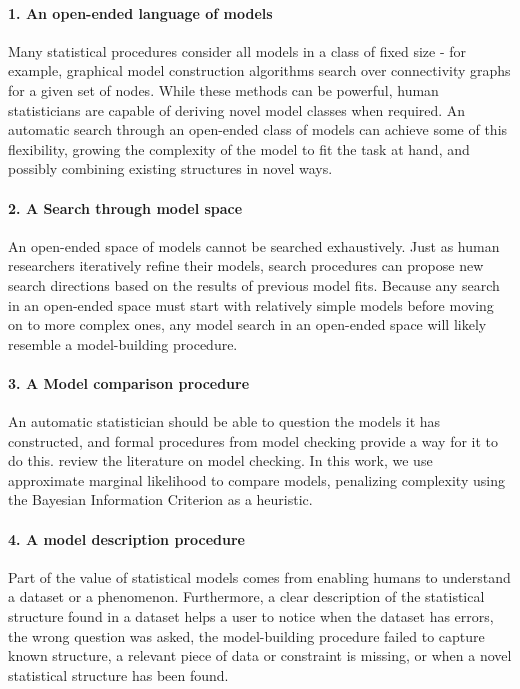 \paragraph{1. An open-ended language of models}
Many statistical procedures consider all models in a class of fixed size - for example, graphical model construction algorithms search over connectivity graphs for a given set of nodes.
While these methods can be powerful, human statisticians are capable of deriving novel model classes when required.
An automatic search through an open-ended class of models can achieve some of this flexibility, growing the complexity of the model to fit the task at hand, and possibly combining existing structures in novel ways.

\paragraph{2. A Search through model space}
An open-ended space of models cannot be searched exhaustively.
Just as human researchers iteratively refine their models, search procedures can propose new search directions based on the results of previous model fits.
Because any search in an open-ended space must start with relatively simple models before moving on to more complex ones, any model search in an open-ended space will likely resemble a model-building procedure.%

\paragraph{3. A Model comparison procedure}
An automatic statistician should be able to question the models it has constructed, and formal procedures from model checking provide a way for it to do this.
\citet{gelman2012philosophy} review the literature on model checking.
In this work, we use approximate marginal likelihood to compare models, penalizing complexity using the Bayesian Information Criterion as a heuristic.

\paragraph{4. A model description procedure}
Part of the value of statistical models comes from enabling humans to understand a dataset or a phenomenon.
Furthermore, a clear description of the statistical structure found in a dataset helps a user to notice when the dataset has errors, the wrong question was asked, the model-building procedure failed to capture known structure, a relevant piece of data or constraint is missing, or when a novel statistical structure has been found.





